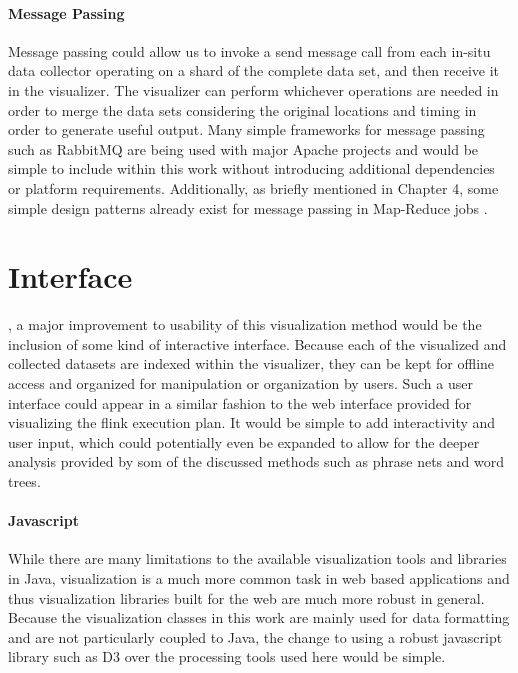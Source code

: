 \paragraph{Message Passing}
Message passing could allow us to invoke a send message call from each in-situ data collector operating on a shard of the complete data set, and then receive it in the visualizer. The visualizer can perform whichever operations are needed in order to merge the data sets considering the original locations and timing in order to generate useful output. Many simple frameworks for message passing such as RabbitMQ are being used with major Apache projects and would be simple to include within this work without introducing additional dependencies or platform requirements. Additionally, as briefly mentioned in Chapter 4, some simple design patterns already exist for message passing in Map-Reduce jobs \cite{Lin2010}.

\section{Interface}
\label{sec:interface}
, a major improvement to usability of this visualization method would be the inclusion of some kind of interactive interface. Because each of the visualized and collected datasets are indexed within the visualizer, they can be kept for offline access and organized for manipulation or organization by users. Such a user interface could appear in a similar fashion to the web interface provided for visualizing the flink execution plan. It would be simple to add interactivity and user input, which could potentially even be expanded to allow for the deeper analysis provided by som of the discussed methods such as phrase nets and word trees.

\paragraph{Javascript}
While there are many limitations to the available visualization tools and libraries in Java, visualization is a much more common task in web based applications and thus visualization libraries built for the web are much more robust in general. Because the visualization classes in this work are mainly used for data formatting and are not particularly coupled to Java, the change to using a robust javascript library such as D3 over the processing tools used here would be simple.


